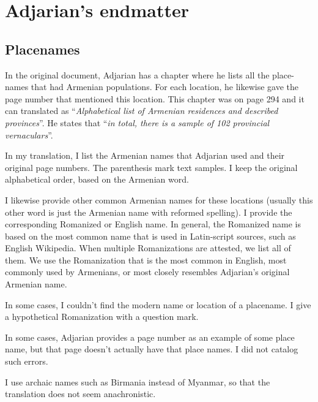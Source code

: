 \part{Adjarian's endmatter}
\chapter{Placenames }



In the original document, Adjarian has a chapter where he lists all the place-names that had Armenian populations. For each location, he likewise gave the page number that mentioned this location.  This chapter was on page   294 and it can translated as ``\textit{Alphabetical list of Armenian residences and described provinces}''. He states that ``\textit{in total, there is a sample of 102 provincial vernaculars}''. 

In my translation, I list the Armenian names that Adjarian used and their original page numbers. The parenthesis mark text samples. I keep the original alphabetical order, based on the Armenian word.

I likewise provide other common Armenian names for these locations (usually this other word is just the Armenian name with reformed spelling). I provide  the corresponding Romanized or English name. In general, the Romanized name is based on the most common name that is used in Latin-script sources, such as English Wikipedia. When multiple Romanizations are attested, we list all of them. We use the Romanization that is the most common in English, most commonly used by Armenians, or most closely resembles Adjarian's original Armenian name.

In some cases, I couldn't find the modern name or location of a placename. I give a hypothetical Romanization  with a question mark. 

In some cases, Adjarian provides a page number as an example of some place name, but that page doesn't actually have that place names. I did not  catalog such errors. 

I use archaic names such as Birmania instead of Myanmar, so that the translation does not seem anachronistic. 


